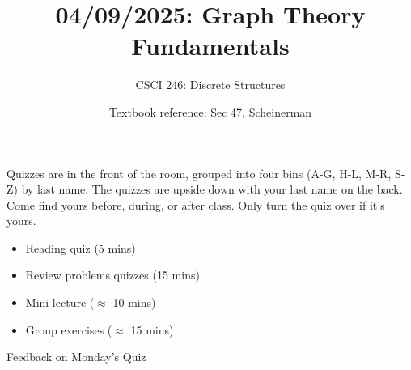 \documentclass[10pt]{beamer}
\begin{document}




\title{04/09/2025: Graph Theory Fundamentals}
\author{CSCI 246: Discrete Structures}
\date{Textbook reference: Sec 47, Scheinerman}

\begin{frame}
    \titlepage 
\end{frame}


\begin{frame}
\small
\begin{mygreenbox}[title=Graded Quiz Pickup]
Quizzes are in the front of the room, grouped into four bins (A-G, H-L, M-R, S-Z) by last name. The quizzes are upside down with your last name on the back. Come find yours before, during, or after class. Only turn the quiz over if it's yours.
\end{mygreenbox} 
\vfill 
%
\vfill 
\begin{myyellowbox}[title=Today's Agenda]
\begin{itemize}
	\item Reading quiz (5 mins)
	\item Review problems quizzes (15 mins)
	\item Mini-lecture ($\approx$ 10 mins)
	\item Group exercises ($\approx$ 15 mins)
\end{itemize}


\end{myyellowbox}
\vfill 

\end{frame}






\begin{frame}[standout]
Feedback on Monday's Quiz
\end{frame}
\end{document}
